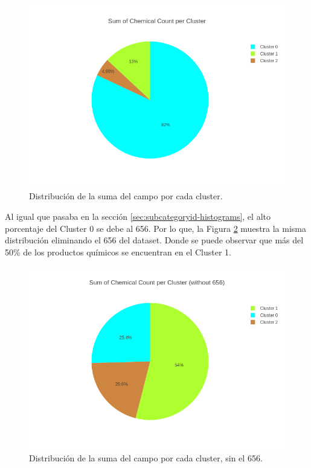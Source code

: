 \begin{figure}[!th]
\includegraphics[scale=0.46]{figures/pie-sum-chemicalcount}
\centering
\caption{Distribución de la suma del campo  por cada cluster.}
\label{fig:pie-sum-chemicalcount}
\end{figure}

Al igual que pasaba en la sección \ref{sec:subcategoryid-histograms}, el alto porcentaje del Cluster 0 se debe al  656. Por lo que, la Figura \ref{fig:pie-sum-chemicalcount-without656} muestra la misma distribución eliminando el  656 del dataset. Donde se puede observar que más del 50\% de los productos químicos se encuentran en el Cluster 1.

\begin{figure}[!th]
\includegraphics[scale=0.46]{figures/pie-sum-chemicalcount-without656}
\centering
\caption{Distribución de la suma del campo  por cada cluster, sin el  656.}
\label{fig:pie-sum-chemicalcount-without656}
\end{figure}
